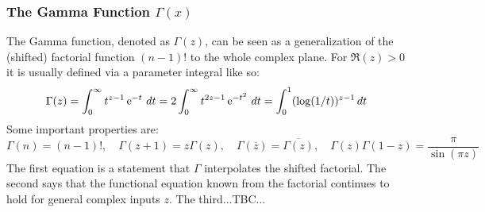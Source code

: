 

\subsubsection{The Gamma Function $\Gamma(x)$}
The Gamma function, denoted as $\Gamma(z)$, can be seen as a generalization of the (shifted) factorial function $(n-1)!$ to the whole complex plane. For $\Re(z)>0$ it is usually defined via a parameter integral like so:
\begin{equation}
\Gamma(z) =	\int_{0}^{\infty} t^{z-1} \operatorname{\mathrm{e}}^{-t} \, dt 
          = 2 \int_{0}^{\infty} t^{2z-1} \operatorname{\mathrm{e}}^{-t^2} \, dt 
          = \int_{0}^{1} (\log(1/t))^{z-1}  \, dt 	
\end{equation}
Some important properties are:
\begin{equation}
\Gamma(n) = (n-1)!, \quad	
\Gamma(z+1) = z \Gamma(z), \quad
\Gamma(\overline{z}) = \overline{\Gamma(z)}, \quad
\Gamma(z) \Gamma(1-z) = \frac{\pi}{\sin(\pi z)}
\end{equation}
The first equation is a statement that $\Gamma$ interpolates the shifted factorial. The second says that the functional equation known from the factorial continues to hold for general complex inputs $z$. The third...TBC...




